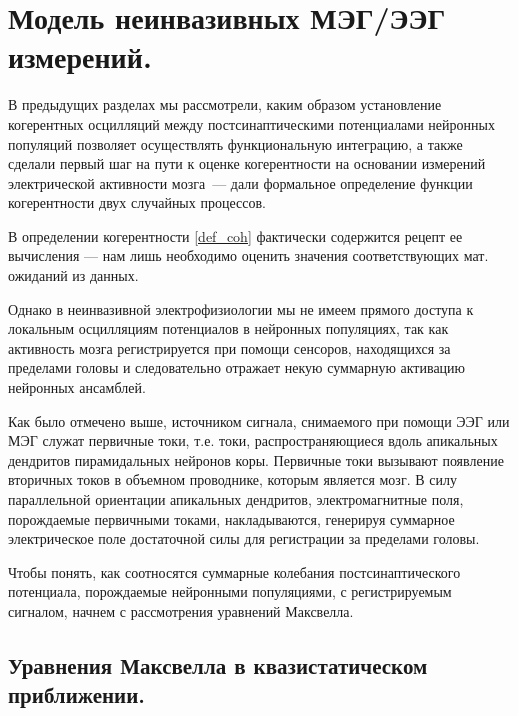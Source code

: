 

\section{Модель неинвазивных МЭГ/ЭЭГ измерений.}

В предыдущих разделах мы рассмотрели, каким образом установление когерентных
осцилляций между постсинаптическими потенциалами нейронных популяций позволяет
осуществлять функциональную интеграцию, а также сделали первый шаг на пути к
оценке когерентности на основании измерений электрической активности мозга~---
дали формальное определение функции когерентности двух случайных процессов.

В определении когерентности \ref{def_coh} фактически содержится рецепт ее
вычисления --- нам лишь необходимо оценить значения соответствующих мат.
ожиданий из данных.

Однако в неинвазивной электрофизиологии мы не имеем прямого доступа к локальным
осцилляциям потенциалов в нейронных популяциях, так как активность мозга
регистрируется при помощи сенсоров, находящихся за пределами головы и
следовательно отражает некую суммарную активацию нейронных ансамблей.

Как было отмечено выше, источником сигнала, снимаемого при помощи ЭЭГ или МЭГ
служат первичные токи, т.е. токи, распространяющиеся вдоль апикальных дендритов
пирамидальных нейронов коры.  Первичные токи вызывают появление вторичных токов
в объемном проводнике, которым является мозг.  В силу параллельной ориентации
апикальных дендритов, электромагнитные поля, порождаемые первичными токами,
накладываются, генерируя суммарное электрическое поле достаточной силы для
регистрации за пределами головы.

Чтобы понять, как соотносятся суммарные колебания постсинаптического
потенциала, порождаемые нейронными популяциями, с регистрируемым сигналом,
начнем с рассмотрения уравнений Максвелла.

\subsection{Уравнения Максвелла в квазистатическом приближении.}


